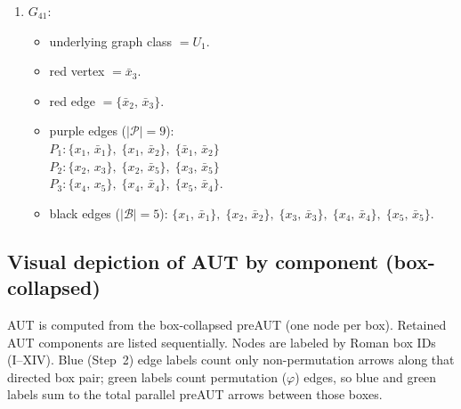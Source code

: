 \begin{enumerate}[leftmargin=*]
\begin{itemize}[leftmargin=*]
$P_{3}: \{x_{4},\,x_{5}\},\; \{x_{4},\,\bar{x}_{4}\},\; \{x_{5},\,\bar{x}_{4}\}$.
\item black edges ($|\mathcal{B}|=5$): $\{x_{1},\,\bar{x}_{1}\},\; \{x_{2},\,\bar{x}_{2}\},\; \{x_{3},\,\bar{x}_{3}\},\; \{x_{4},\,\bar{x}_{4}\},\; \{x_{5},\,\bar{x}_{5}\}$.
\end{itemize}
\item $G_{41}$:
\begin{itemize}[leftmargin=*]
\item underlying graph class $= U_1$.
\item red vertex $= \bar{x}_{3}$.
\item red edge $= \{\bar{x}_{2},\,\bar{x}_{3}\}$.
\item purple edges ($|\mathcal{P}|=9$):\mbox{}\\
$P_{1}: \{x_{1},\,\bar{x}_{1}\},\; \{x_{1},\,\bar{x}_{2}\},\; \{\bar{x}_{1},\,\bar{x}_{2}\}$\\
$P_{2}: \{x_{2},\,x_{3}\},\; \{x_{2},\,\bar{x}_{5}\},\; \{x_{3},\,\bar{x}_{5}\}$\\
$P_{3}: \{x_{4},\,x_{5}\},\; \{x_{4},\,\bar{x}_{4}\},\; \{x_{5},\,\bar{x}_{4}\}$.
\item black edges ($|\mathcal{B}|=5$): $\{x_{1},\,\bar{x}_{1}\},\; \{x_{2},\,\bar{x}_{2}\},\; \{x_{3},\,\bar{x}_{3}\},\; \{x_{4},\,\bar{x}_{4}\},\; \{x_{5},\,\bar{x}_{5}\}$.
\end{itemize}
\end{enumerate}

\subsection*{Visual depiction of AUT by component (box-collapsed)}
AUT is computed from the box-collapsed preAUT (one node per box). Retained AUT components are listed sequentially. Nodes are labeled by Roman box IDs (I--XIV). Blue (Step~2) edge labels count only non-permutation arrows along that directed box pair; green labels count permutation ($\varphi$) edges, so blue and green labels sum to the total parallel preAUT arrows between those boxes.

\clearpage
